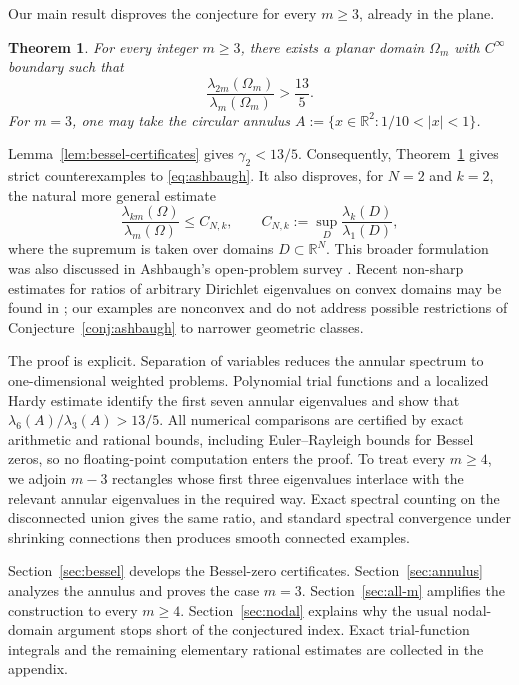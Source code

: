 \documentclass[11pt,letterpaper,reqno]{amsart}
\newtheorem{theorem}{Theorem}[section]
\theoremstyle{definition}
\newcommand{\R}{\mathbb{R}}
\begin{document}
Our main result disproves the conjecture for every $m\geq3$, already in the
plane.

\begin{theorem}\label{thm:main}
For every integer $m\geq3$, there exists a planar domain $\Omega_m$ with
$C^\infty$ boundary such that
\[
 \frac{\lambda_{2m}(\Omega_m)}{\lambda_m(\Omega_m)}>\frac{13}{5}.
\]
For $m=3$, one may take the circular annulus $A:=\bigl\{x\in\R^2:1/10<|x|<1\bigr\}$.
\end{theorem}

Lemma~\ref{lem:bessel-certificates} gives $\gamma_2<13/5$.
Consequently, Theorem~\ref{thm:main} gives strict counterexamples to
\eqref{eq:ashbaugh}.  It also disproves, for $N=2$ and $k=2$, the natural
more general estimate
\[
 \frac{\lambda_{km}(\Omega)}{\lambda_m(\Omega)}\leq C_{N,k},
 \qquad
 C_{N,k}:=\sup_D\frac{\lambda_k(D)}{\lambda_1(D)},
\]
where the supremum is taken over domains $D\subset\R^N$.  This broader
formulation was also discussed in Ashbaugh's open-problem survey
\cite[p.~15]{Ashbaugh1999}.  Recent non-sharp estimates for ratios of arbitrary
Dirichlet eigenvalues on convex domains may be found in \cite{Funano2026};
our examples are nonconvex and do not address possible restrictions of
Conjecture~\ref{conj:ashbaugh} to narrower geometric classes.

The proof is explicit. Separation of variables reduces the annular spectrum
to one-dimensional weighted problems. Polynomial trial functions and a
localized Hardy estimate identify the first seven annular eigenvalues and
show that $\lambda_6(A)/\lambda_3(A)>13/5$. All numerical comparisons are
certified by exact arithmetic and rational bounds, including Euler--Rayleigh
bounds for Bessel zeros, so no floating-point computation enters the proof.
To treat every $m\geq4$, we adjoin $m-3$ rectangles whose first three
eigenvalues interlace with the relevant annular eigenvalues in the required
way. Exact spectral counting on the disconnected union gives the same ratio,
and standard spectral convergence under shrinking connections then produces
smooth connected examples.





Section~\ref{sec:bessel} develops the Bessel-zero certificates.
Section~\ref{sec:annulus} analyzes the annulus and proves the case $m=3$.
Section~\ref{sec:all-m} amplifies the construction to every $m\geq4$.
Section~\ref{sec:nodal} explains why the usual nodal-domain argument stops
short of the conjectured index.  Exact trial-function integrals and the
remaining elementary rational estimates are collected in the appendix.
\end{document}
